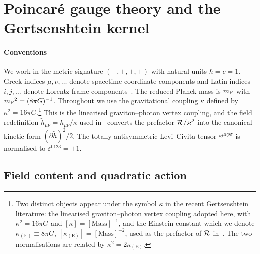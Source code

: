 %

\section{Poincar\'{e} gauge theory and the Gertsenshtein kernel}%
\label{Theory}

\paragraph*{Conventions}
We work in the metric signature $(-,+,+,+)$ with natural units
$\hbar = c = 1$. Greek indices $\mu,\nu,\dots$ denote spacetime
coordinate components and Latin indices $i,j,\dots$ denote Lorentz-frame
components~\cite{barker2024poincare}. The reduced Planck mass is ${m_{\mathrm{P}}}$ with
${m_{\mathrm{P}}}^2 = (8\pi G)^{-1}$. Throughout we use the gravitational coupling
$\kappa$ defined by $\kappa^2 = 16\pi G$.\footnote{%
    Two distinct objects appear under the symbol $\kappa$ in the
    recent Gertsenshtein literature: the linearised
    graviton--photon vertex coupling adopted here, with
    $\kappa^2 = 16\pi G$ and $[\kappa] = [\mathrm{Mass}]^{-1}$, and
    the Einstein constant which we denote
    $\kappa_{(\mathrm{E})}\equiv 8\pi G$,
    $[\kappa_{(\mathrm{E})}] = [\mathrm{Mass}]^{-2}$, used as the
    prefactor of $\MAGF{}$
    in~\cite{barker2024poincare,barker2023confinement,barker2024psalter}.
    The two normalisations are related by
    $\kappa^2 = 2\kappa_{(\mathrm{E})}$.
} This is the linearised graviton--photon vertex coupling, and the
field redefinition $\tilde{h}_{\mu\nu} = h_{\mu\nu}/\kappa$ used
in~\cite{lella2024constraining} converts the prefactor
$\MAGF{}/\kappa^2$ into the canonical kinetic form
$(\partial\tilde{h})^2/2$. The totally antisymmetric
Levi--Civita tensor $\varepsilon^{\mu\nu\rho\sigma}$ is normalised to
$\varepsilon^{0123} = +1$.

\subsection{Field content and quadratic action}%
\label{PGTframework}

